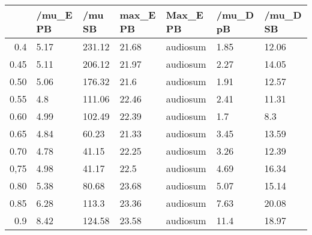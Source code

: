 \begin{table}[ht]
\centering
\begin{tabular}{rllllll}
  \hline
 & /mu\_E PB & /mu SB & max\_E PB & Max\_E PB & /mu\_D pB & /mu\_D SB \\ 
  \hline
0.4 & 5.17 & 231.12 & 21.68 & audiosum & 1.85 & 12.06 \\ 
  0.45 & 5.11 & 206.12 & 21.97 & audiosum & 2.27 & 14.05 \\ 
  0.50 & 5.06 & 176.32 & 21.6 & audiosum & 1.91 & 12.57 \\ 
  0.55 & 4.8 & 111.06 & 22.46 & audiosum & 2.41 & 11.31 \\ 
  0.60 & 4.99 & 102.49 & 22.39 & audiosum & 1.7 & 8.3 \\ 
  0.65 & 4.84 & 60.23 & 21.33 & audiosum & 3.45 & 13.59 \\ 
  0.70 & 4.78 & 41.15 & 22.25 & audiosum & 3.26 & 12.39 \\ 
  0,75 & 4.98 & 41.17 & 22.5 & audiosum & 4.69 & 16.34 \\ 
  0.80 & 5.38 & 80.68 & 23.68 & audiosum & 5.07 & 15.14 \\ 
  0.85 & 6.28 & 113.3 & 23.36 & audiosum & 7.63 & 20.08 \\ 
  0.9 & 8.42 & 124.58 & 23.58 & audiosum & 11.4 & 18.97 \\ 
   \hline
\end{tabular}
\end{table}

